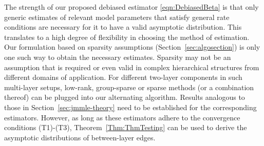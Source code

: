 The strength of our proposed debiased estimator \eqref{eqn:DebiasedBeta} is that only generic estimates of relevant model parameters that satisfy general rate conditions are necessary for it to have a valid asymptotic distribution. This translates to a high degree of flexibility in choosing the method of estimation. Our formulation based on sparsity assumptions (Section~\ref{sec:algosection}) is only one such way to obtain the necessary estimates. Sparsity may not be an assumption that is required or even valid in complex hierarchical structures from different domains of application. For different two-layer components in such multi-layer setups, low-rank, group-sparse or sparse methods (or a combination thereof) can be plugged into our alternating algorithm. Results analogous to those in Section~\ref{sec:jmmle-theory} need to be established for the corresponding estimators. However, as long as these estimators adhere to the convergence conditions (T1)-(T3), Theorem~\ref{Thm:ThmTesting} can be used to derive the asymptotic distributions of between-layer edges.